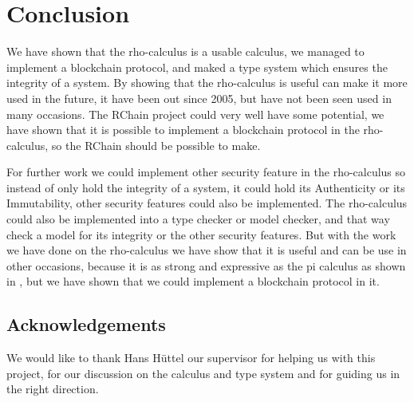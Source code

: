 \section{Conclusion}
We have shown that the rho-calculus is a usable calculus, we managed to implement a blockchain protocol, and maked a type system which ensures the integrity of a system. By showing that the rho-calculus is useful can make it more used in the future, it have been out since 2005, but have not been seen used in many occasions. The RChain project could very well have some potential, we have shown that it is possible to implement a blockchain protocol in the rho-calculus, so the RChain should be possible to make.

For further work we could implement other security feature in the rho-calculus so instead of only hold the integrity of a system, it could hold its Authenticity or its Immutability, other security features could also be implemented. The rho-calculus could also be implemented into a type checker or model checker, and that way check a model for its integrity or the other security features. But with the work we have done on the rho-calculus we have show that it is useful and can be use in other occasions, because it is as strong and expressive as the pi calculus as shown in \citep{Meredith2005}, but we have shown that we could implement a blockchain protocol in it.


\subsection*{Acknowledgements}
We would like to thank Hans Hüttel our supervisor for helping us with this project, for our discussion on the calculus and type system and for guiding us in the right direction.
